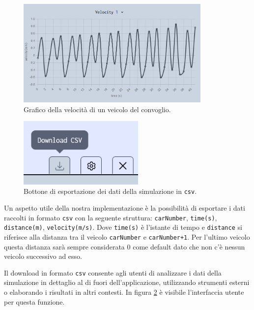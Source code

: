 \begin{figure}[H]
    \vspace{0.5em}
    \centering
    \includegraphics[width=0.85\textwidth, keepaspectratio]{images/4-frontend/velocity-graph.png}
    \caption{Grafico della velocità di un veicolo del convoglio.}
    \label{fig:velocity-graph}
\end{figure}

\begin{figure}[H]
    \centering
    \captionsetup{justification=centering, margin=3cm}
    \includegraphics[width=0.55\textwidth, keepaspectratio]{images/4-frontend/csv-export.png}
    \caption{Bottone di esportazione dei dati della simulazione in \texttt{csv}.}
    \label{fig:csv-export}
\end{figure}

Un aspetto utile della nostra implementazione è la possibilità di esportare i dati raccolti in formato \texttt{csv} con la seguente struttura: \texttt{carNumber}, \texttt{time(s)}, \texttt{distance(m)}, \texttt{velocity(m/s)}. Dove \texttt{time(s)} è l'istante di tempo e \texttt{distance} si riferisce alla distanza tra il veicolo \texttt{carNumber} e \texttt{carNumber+1}. Per l'ultimo veicolo questa distanza sarà sempre considerata 0 come default dato che non c'è nessun veicolo successivo ad esso.

Il download in formato \texttt{csv} consente agli utenti di analizzare i dati della simulazione in dettaglio al di fuori dell'applicazione, utilizzando strumenti esterni o elaborando i risultati in altri contesti. In figura \ref{fig:csv-export} è visibile l'interfaccia utente per questa funzione.

